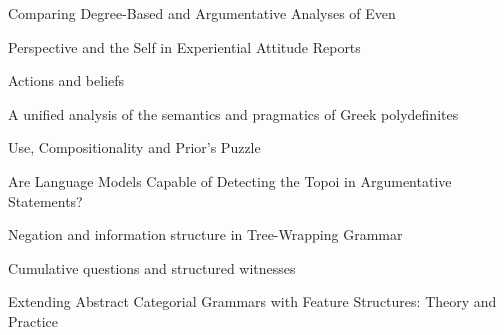 \documentclass[12pt]{jarticle}
\begin{document}
      {Comparing Degree-Based and Argumentative Analyses of Even}
      {}




  
      {Perspective and the Self in Experiential Attitude Reports}
      {}
  
      {Actions and beliefs}
      {}
  
      {A unified analysis of the semantics and pragmatics of Greek polydefinites}
      {}




  
      {Use, Compositionality and Prior's Puzzle}
      {}
  
      {Are Language Models Capable of Detecting the Topoi in Argumentative Statements?}
      {}
  
      {Negation and information structure in Tree-Wrapping Grammar}
      {}




  
      {Cumulative questions and structured witnesses}
      {}
  
      {Extending Abstract Categorial Grammars with Feature Structures: Theory and Practice}
      {}






  
\end{document}
